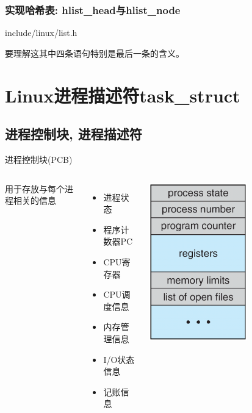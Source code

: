 \documentclass[xcolor=svgnames]{beamer}
\begin{document}
\begin{CJK*}{UTF8}{gbsn}
\begin{frame}[fragile]
\frametitle{实现哈希表: hlist\_head与hlist\_node}
\begin{block}{include/linux/list.h}
\lstaddbefore
\end{block}
要理解这其中四条语句特别是最后一条的含义。
\end{frame}


\section{Linux进程描述符task\_struct}

\subsection{进程控制块, 进程描述符}

\begin{frame}{进程控制块(PCB)}
\begin{columns}%
用于存放与每个进程相关的信息
\begin{itemize}
\item 进程状态
\item 程序计数器PC
\item CPU寄存器
\item CPU调度信息
\item 内存管理信息
\item I/O状态信息
\item 记账信息
\end{itemize}
\includegraphics[width=0.6\textwidth]{PCB.png}
\end{columns}%
\end{frame}


\end{CJK*}
\end{document}
